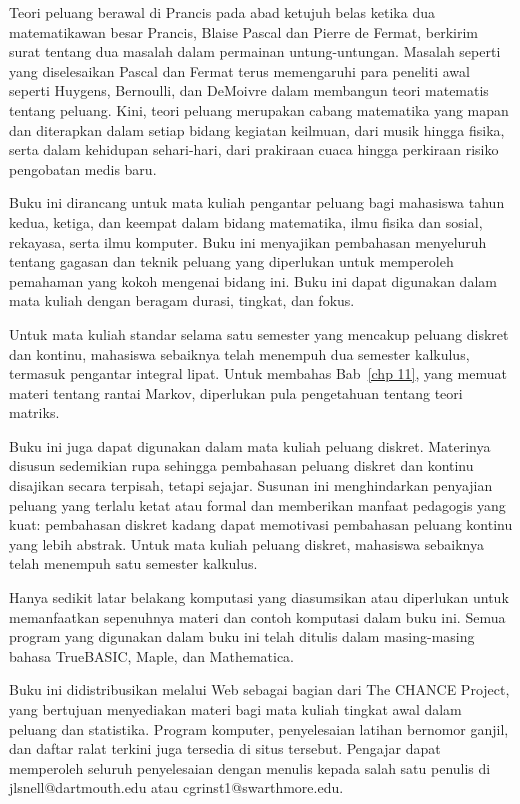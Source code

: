 Teori peluang berawal di Prancis pada abad ketujuh belas ketika dua
matematikawan besar Prancis, Blaise Pascal dan Pierre de Fermat, berkirim surat
tentang dua masalah dalam permainan untung-untungan. Masalah seperti yang
diselesaikan Pascal dan Fermat terus memengaruhi para peneliti awal seperti
Huygens, Bernoulli, dan DeMoivre dalam membangun teori matematis tentang
peluang. Kini, teori peluang merupakan cabang matematika yang mapan dan
diterapkan dalam setiap bidang kegiatan keilmuan, dari musik hingga fisika,
serta dalam kehidupan sehari-hari, dari prakiraan cuaca hingga perkiraan risiko
pengobatan medis baru.

Buku ini dirancang untuk mata kuliah pengantar peluang bagi mahasiswa tahun
kedua, ketiga, dan keempat dalam bidang matematika, ilmu fisika dan sosial,
rekayasa, serta ilmu komputer. Buku ini menyajikan pembahasan menyeluruh
tentang gagasan dan teknik peluang yang diperlukan untuk memperoleh pemahaman
yang kokoh mengenai bidang ini. Buku ini dapat digunakan dalam mata kuliah
dengan beragam durasi, tingkat, dan fokus.

Untuk mata kuliah standar selama satu semester yang mencakup peluang diskret
dan kontinu, mahasiswa sebaiknya telah menempuh dua semester kalkulus,
termasuk pengantar integral lipat. Untuk membahas Bab~\ref{chp 11}, yang
memuat materi tentang rantai Markov, diperlukan pula pengetahuan tentang teori
matriks.

Buku ini juga dapat digunakan dalam mata kuliah peluang diskret. Materinya
disusun sedemikian rupa sehingga pembahasan peluang diskret dan kontinu
disajikan secara terpisah, tetapi sejajar. Susunan ini menghindarkan penyajian
peluang yang terlalu ketat atau formal dan memberikan manfaat pedagogis yang
kuat: pembahasan diskret kadang dapat memotivasi pembahasan peluang kontinu
yang lebih abstrak. Untuk mata kuliah peluang diskret, mahasiswa sebaiknya
telah menempuh satu semester kalkulus.

Hanya sedikit latar belakang komputasi yang diasumsikan atau diperlukan untuk
memanfaatkan sepenuhnya materi dan contoh komputasi dalam buku ini. Semua
program yang digunakan dalam buku ini telah ditulis dalam masing-masing bahasa
TrueBASIC, Maple, dan Mathematica.

Buku ini didistribusikan melalui Web sebagai bagian dari The CHANCE Project, yang
bertujuan menyediakan materi bagi mata kuliah tingkat awal dalam peluang dan
statistika. Program komputer, penyelesaian latihan bernomor ganjil, dan daftar
ralat terkini juga tersedia di situs tersebut. Pengajar dapat memperoleh
seluruh penyelesaian dengan menulis kepada salah satu penulis di
jlsnell@dartmouth.edu atau cgrinst1@swarthmore.edu.

